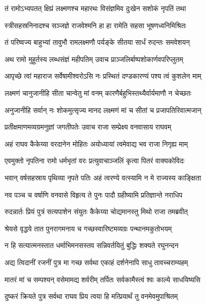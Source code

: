 \twolineshloka
{तं रामोऽभ्यपतत् क्षिप्रं लक्ष्मणश्च महारथः}
{विसंज्ञमिव दुःखेन सशोकं नृपतिं तथा} %

\twolineshloka
{स्त्रीसहस्रनिनादश्च सञ्जज्ञे राजवेश्मनि}
{हा हा रामेति सहसा भूषणध्वनिमिश्रितः} %

\twolineshloka
{तं परिष्वज्य बाहुभ्यां तावुभौ रामलक्ष्मणौ}
{पर्यङ्के सीतया सार्धं रुदन्तः समवेशयन्} %

\twolineshloka
{अथ रामो मुहूर्तस्य लब्धसंज्ञं महीपतिम्}
{उवाच प्राञ्जलिर्बाष्पशोकार्णवपरिप्लुतम्} %

\twolineshloka
{आपृच्छे त्वां महाराज सर्वेषामीश्वरोऽसि नः}
{प्रस्थितं दण्डकारण्यं पश्य त्वं कुशलेन माम्} %

\twolineshloka
{लक्ष्मणं चानुजानीहि सीता चान्वेतु मां वनम्}
{कारणैर्बहुभिस्तथ्यैर्वार्यमाणौ न चेच्छतः} %

\twolineshloka
{अनुजानीहि सर्वान् नः शोकमुत्सृज्य मानद}
{लक्ष्मणं मां च सीतां च प्रजापतिरिवात्मजान्} %

\twolineshloka
{प्रतीक्षमाणमव्यग्रमनुज्ञां जगतीपतेः}
{उवाच राजा सम्प्रेक्ष्य वनवासाय राघवम्} %

\twolineshloka
{अहं राघव कैकेय्या वरदानेन मोहितः}
{अयोध्यायां त्वमेवाद्य भव राजा निगृह्य माम्} %

\twolineshloka
{एवमुक्तो नृपतिना रामो धर्मभृतां वरः}
{प्रत्युवाचाञ्जलिं कृत्वा पितरं वाक्यकोविदः} %

\twolineshloka
{भवान् वर्षसहस्राय पृथिव्या नृपते पतिः}
{अहं त्वरण्ये वत्स्यामि न मे राज्यस्य काङ्क्षिता} %

\twolineshloka
{नव पञ्च च वर्षाणि वनवासे विहृत्य ते}
{पुनः पादौ ग्रहीष्यामि प्रतिज्ञान्ते नराधिप} %

\twolineshloka
{रुदन्नार्तः प्रियं पुत्रं सत्यपाशेन संयुतः}
{कैकेय्या चोद्यमानस्तु मिथो राजा तमब्रवीत्} %

\twolineshloka
{श्रेयसे वृद्धये तात पुनरागमनाय च}
{गच्छस्वारिष्टमव्यग्रः पन्थानमकुतोभयम्} %

\twolineshloka
{न हि सत्यात्मनस्तात धर्माभिमनसस्तव}
{सन्निवर्तयितुं बुद्धिः शक्यते रघुनन्दन} %

\twolineshloka
{अद्य त्विदानीं रजनीं पुत्र मा गच्छ सर्वथा}
{एकाहं दर्शनेनापि साधु तावच्चराम्यहम्} %

\twolineshloka
{मातरं मां च सम्पश्यन् वसेमामद्य शर्वरीम्}
{तर्पितः सर्वकामैस्त्वं श्वः काल्ये साधयिष्यसि} %

\twolineshloka
{दुष्करं क्रियते पुत्र सर्वथा राघव प्रिय}
{त्वया हि मत्प्रियार्थं तु वनमेवमुपाश्रितम्} %

